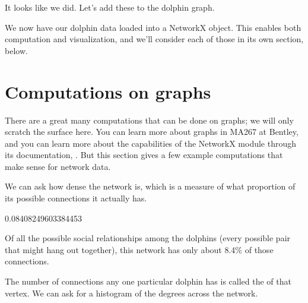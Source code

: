 \documentclass[letterpaper,10pt,english]{sphinxmanual}
\begin{document}
It looks like we did.  Let’s add these to the dolphin graph.

\begin{sphinxVerbatim}[commandchars=\\\{\}]
  
\end{sphinxVerbatim}

We now have our dolphin data loaded into a NetworkX  object.  This enables both computation and visualization, and we’ll consider each of those in its own section, below.


\section{Computations on graphs}
\label{\detokenize{chapter-15-networks:computations-on-graphs}}
There are a great many computations that can be done on graphs; we will only scratch the surface here.  You can learn more about graphs in MA267 at Bentley, and you can learn more about the capabilities of the NetworkX module through its documentation, .  But this section gives a few example computations that make sense for network data.

We can ask how dense the network is, which is a measure of what proportion of its possible connections it actually has.

\begin{sphinxVerbatim}[commandchars=\\\{\}]
  
\end{sphinxVerbatim}

\begin{sphinxVerbatim}[commandchars=\\\{\}]
0.08408249603384453
\end{sphinxVerbatim}

Of all the possible social relationships among the dolphins (every possible pair that might hang out together), this network has only about 8.4\% of those connections.

The number of connections any one particular dolphin has is called the  of that vertex.  We can ask for a histogram of the degrees across the network.

\begin{sphinxVerbatim}[commandchars=\\\{\}]
  
\end{sphinxVerbatim}
\end{document}
